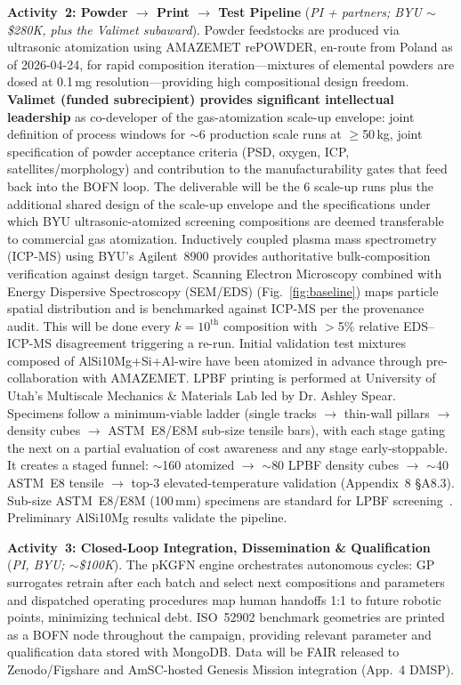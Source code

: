 \documentclass[11pt,letterpaper]{article}
\begin{document}
\textbf{Activity~2: Powder $\to$ Print $\to$ Test Pipeline}
(\emph{PI + partners; BYU {$\sim$}\$280K, plus the Valimet subaward}).
%
Powder feedstocks are produced via ultrasonic atomization using AMAZEMET
rePOWDER, en-route from Poland as of 2026-04-24, for rapid
composition iteration---mixtures of elemental powders are dosed at
0.1\,mg resolution---providing high
compositional design freedom.
\textbf{Valimet (funded subrecipient) provides significant
intellectual leadership} as co-developer of the
gas-atomization scale-up envelope: joint definition of process windows
for $\sim$6 production scale runs at $\geq$50\,kg, joint specification
of powder acceptance criteria (PSD, oxygen, ICP, satellites/morphology) and contribution to the manufacturability gates that feed back into the
BOFN loop. The deliverable will be the 6 scale-up runs plus the additional shared design of the scale-up envelope and the
specifications under which BYU ultrasonic-atomized screening
compositions are deemed transferable to commercial gas atomization.
Inductively coupled plasma mass spectrometry (ICP-MS) using BYU's Agilent~8900 provides authoritative bulk-composition
verification against design target. Scanning Electron Microscopy combined with Energy Dispersive Spectroscopy (SEM/EDS) (Fig.~\ref{fig:baseline})
maps particle spatial distribution and is benchmarked against
ICP-MS per the provenance audit. This will be done every $k{=}10^{\text{th}}$ composition with
$>$5\% relative EDS--ICP-MS disagreement triggering a re-run. Initial
validation test mixtures composed of AlSi10Mg+Si+Al-wire have been
atomized in advance through pre-collaboration with AMAZEMET.
LPBF printing is performed at University of Utah's Multiscale Mechanics \& Materials Lab led by Dr. Ashley Spear. Specimens follow a
minimum-viable ladder (single tracks $\to$ thin-wall pillars $\to$
density cubes $\to$ ASTM~E8/E8M sub-size tensile bars), with each stage
gating the next on a partial evaluation of cost awareness and any stage
early-stoppable. It creates a staged funnel: $\sim$160 atomized $\to$ $\sim$80 LPBF
density cubes
$\to$ $\sim$40 ASTM~E8
tensile $\to$ top-3 elevated-temperature validation
(Appendix~8 \S A8.3).
Sub-size ASTM~E8/E8M (100\,mm) specimens are standard for LPBF
screening~\cite{paraschiv_2023_ma16144930,wang_2020_17452759}.
Preliminary AlSi10Mg results validate the pipeline.

\textbf{Activity~3: Closed-Loop Integration, Dissemination \&
Qualification} (\emph{PI, BYU; {$\sim$}\$100K}).
%
The pKGFN engine orchestrates autonomous cycles: GP surrogates retrain
after each batch and select next compositions and parameters and
dispatched operating procedures map human handoffs 1:1 to future robotic
points, minimizing technical debt. ISO~52902 benchmark geometries are
printed as a BOFN node throughout the campaign, providing relevant parameter and qualification data stored with MongoDB. Data will be FAIR released to
Zenodo/Figshare and AmSC-hosted Genesis Mission integration (App.~4 DMSP).
\end{document}
